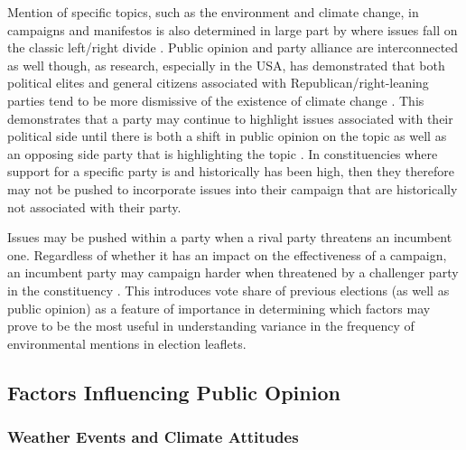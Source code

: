 \documentclass[12pt,letterpaper]{article}
\begin{document}
Mention of specific topics, such as the environment and climate change, in campaigns and manifestos is also determined in large part by where issues fall on the classic left/right divide \autocite{farstadWhatExplainsVariation2018}. Public opinion and party alliance are interconnected as well though, as research, especially in the USA, has demonstrated that both political elites and general citizens associated with Republican/right-leaning parties tend to be more dismissive of the existence of climate change  \autocite{dunlapPoliticalDivideClimate2016,mccrightPoliticizationClimateChange2011}. This demonstrates that a party may continue to highlight issues associated with their political side until there is both a shift in public opinion on the topic as well as an opposing side party that is highlighting the topic \autocite{carterPartyPoliticizationEnvironment2006}. In constituencies where support for a specific party is and historically has been high, then they therefore may not be pushed to incorporate issues into their campaign that are historically not associated with their party. 

Issues may be pushed within a party when a rival party threatens an incumbent one. Regardless of whether it has an impact on the effectiveness of a campaign, an incumbent party may campaign harder when threatened by a challenger party in the constituency \autocite{pattieIncumbentPartiesIncumbent2017a}. This introduces vote share of previous elections (as well as public opinion) as a feature of importance in determining which factors may prove to be the most useful in understanding variance in the frequency of environmental mentions in election leaflets.


\subsection{Factors Influencing Public Opinion}

\subsubsection{Weather Events and Climate Attitudes}
\end{document}

